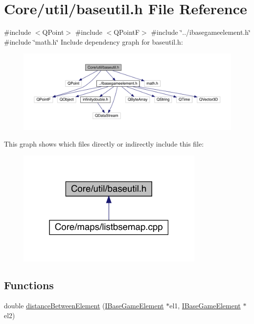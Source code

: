 \hypertarget{a00068}{}\section{Core/util/baseutil.h File Reference}
\label{a00068}
{\ttfamily \#include $<$Q\+Point$>$}\newline
{\ttfamily \#include $<$Q\+PointF$>$}\newline
{\ttfamily \#include \char`\"{}../ibasegameelement.\+h\char`\"{}}\newline
{\ttfamily \#include \char`\"{}math.\+h\char`\"{}}\newline
Include dependency graph for baseutil.\+h\+:
\nopagebreak
\begin{figure}[H]
\begin{center}
\leavevmode
\includegraphics[width=350pt]{d4/d31/a00069}
\end{center}
\end{figure}
This graph shows which files directly or indirectly include this file\+:
\nopagebreak
\begin{figure}[H]
\begin{center}
\leavevmode
\includegraphics[width=262pt]{d2/db1/a00070}
\end{center}
\end{figure}
\subsection*{Functions}
\begin{DoxyCompactItemize}
\item 
double \hyperlink{a00068_a1ab36c07a61bd9f450ed0ac1ba68ed94}{distance\+Between\+Element} (\hyperlink{a00137}{I\+Base\+Game\+Element} $\ast$el1, \hyperlink{a00137}{I\+Base\+Game\+Element} $\ast$el2)
\end{DoxyCompactItemize}


